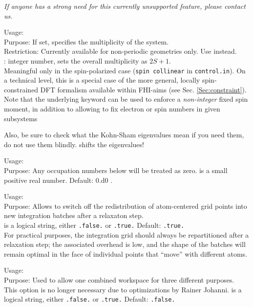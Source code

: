 \emph{If anyone has a strong need for this currently unsupported
  feature, please contact us.}


{
 \noindent
 Usage:   \\[1.0ex]
 Purpose: If set, specifies the multiplicity of the system. \\[1.0ex]
 Restriction: Currently available for non-periodic geometries
   only. Use  instead. \\[1.0ex] 
   : integer number, sets the overall multiplicity as
 $2S+1$. \\ 
} 
Meaningful only in the spin-polarized case (\texttt{spin collinear} in
\texttt{control.in}). On a technical level, this is a special case of
the more general, locally spin-constrained DFT formalism available
within FHI-aims (see Sec. \ref{Sec:constraint}). Note that the underlying
 keyword can be used to enforce a
\emph{non-integer} fixed spin moment, in addition to allowing to fix
electron or spin numbers in given subsystems  

Also, be sure to check what the Kohn-Sham eigenvalues mean if you need
them, do not use them blindly.  shifts the
eigenvalues! 

{
  \noindent
  Usage:   \\[1.0ex]
  Purpose: Any occupation numbers below  will be treated
    as zero.  
   is a small positive real number. Default: 0.d0 .
}

{
  \noindent
  Usage:  
    \\[1.0ex]
  Purpose: Allows to switch off the redistribution of atom-centered
    grid points into new integration batches after a relaxaton
    step. \\[1.0ex] 
   is a logical string, either \texttt{.false.} or
    \texttt{.true.} Default: \texttt{.true.} \\
}
For practical purposes, the integration grid should always be
repartitioned after a relaxation step; the associated overhead is low,
and the shape of the batches will remain optimal in the face of
individual points that ``move'' with different atoms. 

{
  \noindent
  Usage:   \\[1.0ex]
  Purpose: Used to allow one combined workspace for three different
    purposes. \\[1.0ex]
  This option is no longer necessary due to optimizations by Rainer
  Johanni.
   is a logical string, either \texttt{.false.} or
  \texttt{.true.} Default: \texttt{.false.} \\  
}


